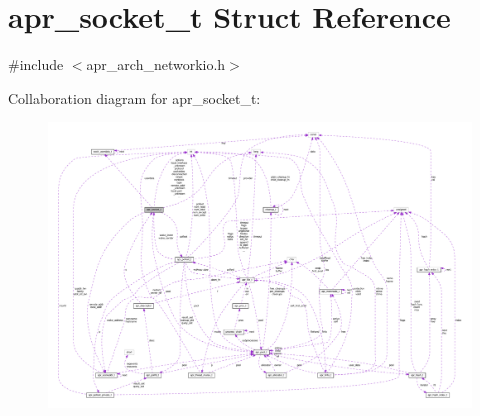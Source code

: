 \hypertarget{structapr__socket__t}{}\section{apr\+\_\+socket\+\_\+t Struct Reference}
\label{structapr__socket__t}


{\ttfamily \#include $<$apr\+\_\+arch\+\_\+networkio.\+h$>$}



Collaboration diagram for apr\+\_\+socket\+\_\+t\+:
\nopagebreak
\begin{figure}[H]
\begin{center}
\leavevmode
\includegraphics[width=350pt]{structapr__socket__t__coll__graph}
\end{center}
\end{figure}
